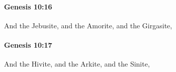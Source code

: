 		\paragraph{Genesis 10:16} %
			\label{GENESIS-10-16}

			And the Jebusite, and the Amorite, and the Girgasite,


		\paragraph{Genesis 10:17} %
			\label{GENESIS-10-17}

			And the Hivite, and the Arkite, and the Sinite,


